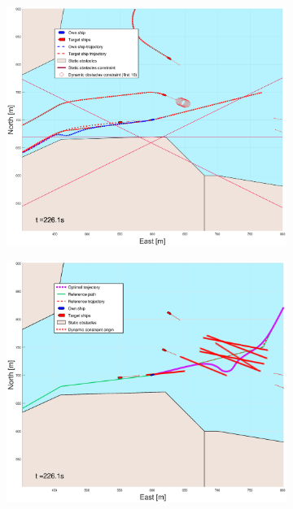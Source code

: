 \begin{figure}[ht]\ContinuedFloat
    \begin{subfigure}[b]{0.49\textwidth}
        \centering
        \includegraphics[width=\textwidth]{Images/Figures/Trheimfjord/_Simple_1fig1_time=226}
    \end{subfigure}
    \hfill
    \begin{subfigure}[b]{0.499\textwidth}
        \centering
        \includegraphics[width=\textwidth]{Images/Figures/Trheimfjord/_Simple_1fig999_time=226}

\end{subfigure}
\end{figure}
